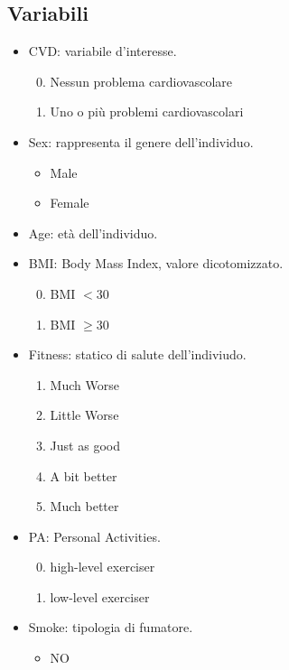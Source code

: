 \documentclass{article}\usepackage[]{graphicx}\usepackage[]{xcolor}
\begin{document}
  \subsection{Variabili}
    \begin{itemize}
      \item CVD: variabile d'interesse.
        \begin{enumerate}
          \setcounter{enumi}{-1}
          \item Nessun problema cardiovascolare
          \item Uno o più problemi cardiovascolari
        \end{enumerate}
      \item Sex: rappresenta il genere dell'individuo.
        \begin{itemize}
          \item Male
          \item Female
        \end{itemize}
      \item Age: età dell'individuo.
      \item BMI: Body Mass Index, valore dicotomizzato.
        \begin{enumerate}
          \setcounter{enumi}{-1}
          \item BMI $< 30$
          \item BMI $\ge 30$ 
        \end{enumerate}
      \item Fitness: statico di salute dell'indiviudo.
        \begin{enumerate}
          \item Much Worse 
          \item Little Worse
          \item Just as good
          \item A bit better
          \item Much better
        \end{enumerate}
      \item PA: Personal Activities.
        \begin{enumerate}
          \setcounter{enumi}{-1}
          \item high-level exerciser 
          \item low-level exerciser
        \end{enumerate}
      \item Smoke: tipologia di fumatore.
        \begin{itemize}
          \item NO 

\end{itemize}
\end{itemize}
\end{document}
